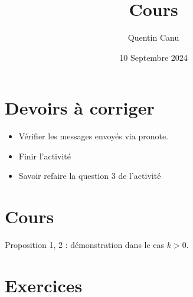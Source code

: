 \documentclass{article}
\title{Cours}
\date{10 Septembre 2024}
\author{Quentin Canu}
\begin{document}
\maketitle

\section{Devoirs à corriger}
\begin{itemize}
\item Vérifier les messages envoyés via pronote.
\item Finir l'activité
\item Savoir refaire la question $3$ de l'activité
\end{itemize}
\section{Cours}
Proposition 1, 2 : démonstration dans le cas $k > 0$.
\section{Exercices}
\end{document}
